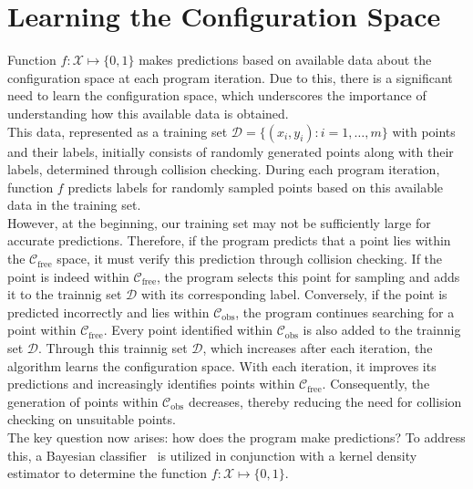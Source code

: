 \documentclass{ctuthesis}
\begin{document}
\section{Learning the Configuration Space} 
Function \( f: \mathcal{X} \mapsto \{0,1\} \)  makes predictions based on available data about 
the configuration space at each program iteration. 
Due to this, there is a significant need to learn the configuration space, 
which underscores the importance of understanding how this available data is obtained.
\\[12pt]
This data, represented as a training set  \( \mathcal{D} = \{ (x_i, y_i) : i = 1, \ldots, m \} \) with points and their labels, 
initially consists of randomly generated points along with their labels, 
determined through collision checking. 
During each program iteration, 
function \( f \) predicts labels for randomly sampled points based on this available data in the training set.
\\[12pt]
However, at the beginning, our training set may not be sufficiently large for accurate predictions. 
Therefore, if the program predicts that a point lies 
within the \( \mathcal{C}_{\text{free}} \) space, 
it must verify this prediction through collision checking. 
If the point is indeed within \( \mathcal{C}_{\text{free}} \), 
the program selects this point for sampling and adds it to the trainnig set $\mathcal{D}$ with 
its corresponding label. 
Conversely, if the point is predicted incorrectly and 
lies within \( \mathcal{C}_{\text{obs}} \), 
the program continues searching for a point within \( \mathcal{C}_{\text{free}} \). 
Every point identified within \( \mathcal{C}_{\text{obs}} \) is also added to the trainnig set $\mathcal{D}$.
Through this trainnig set $\mathcal{D}$, which increases after each iteration, 
the algorithm learns the configuration space. 
With each iteration, it improves its predictions and increasingly identifies points
within \( \mathcal{C}_{\text{free}} \). 
Consequently, the generation of points within \( \mathcal{C}_{\text{obs}} \) decreases, 
thereby reducing the need for collision checking on unsuitable points.
\\[12pt]
The key question now arises: how does the program make predictions? 
To address this, 
a Bayesian classifier~\cite{Bishop2006Pattern} is utilized in conjunction 
with a kernel density estimator to determine the function \( f: \mathcal{X} \mapsto \{0,1\} \).
\end{document}
